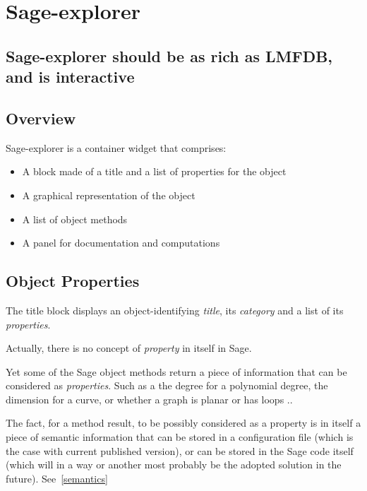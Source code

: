 \documentclass{deliverablereport}
\begin{document}
\section{Sage-explorer}
\label{section:sage-explorer}


\subsection{Sage-explorer should be as rich as LMFDB, and is interactive}



\subsection{Overview}

Sage-explorer is a container widget that comprises:

\begin{itemize}
  \item A block made of a title and a list of properties for the object
  \item A graphical representation of the object
  \item A list of object methods
  \item A panel for documentation and computations
\end{itemize}


\subsection{Object Properties}

The title block displays an object-identifying \emph{title}, its
\emph{category} and a list of its \emph{properties}.

Actually, there is no concept of \emph{property} in itself in Sage.

Yet some of the Sage object methods return a piece of information that
can be considered as \emph{properties}. Such as a the degree for a
polynomial degree, the dimension for a curve, or whether a graph is
planar or has loops ..

The fact, for a method result, to be possibly considered as a property
is in itself a piece of semantic information that can be stored in a
configuration file (which is the case with current published version),
or can be stored in the Sage code itself (which will in a way or
another most probably be the adopted solution in the future). See~\ref{semantics}
\end{document}

